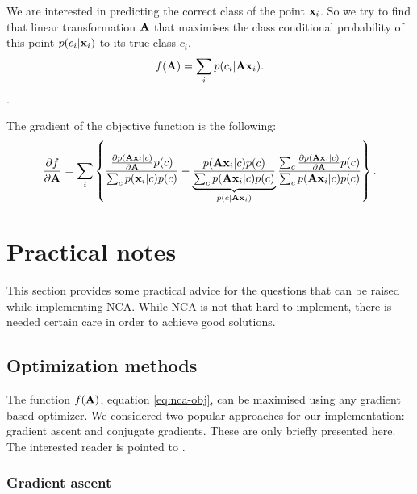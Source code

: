 	We are interested in predicting the correct class of the point $\mathbf{x}_i$. So we
	try to find that linear transformation $\mathbf{A}$ that maximises the class
	conditional probability of this point $p(c_i|\mathbf{x}_i)$ to its true class $c_i$.
	\begin{align}
	    f(\mathbf{A}) = \sum_i p(c_i|\mathbf{A}\mathbf{x}_i).
	    \label{eq:nca-cc-kde-obj}
	\end{align}.
	
	The gradient of the objective function is the following:
	\begin{align}
	    \frac{\partial f}{\partial \mathbf{A}} =
	      \sum_i \left\{
	                \frac
	                {
	                    \frac{\partial p(\mathbf{A}\mathbf{x}_i|c)}{\partial \mathbf{A}}p(c)
	                }
	                {
	                    \sum_c p(\mathbf{x}_i|c)p(c)
	                }
	                - \underbrace{\frac{
	                    p(\mathbf{A}\mathbf{x}_i|c)p(c)
	                }{
	                    \sum_c p(\mathbf{A}\mathbf{x}_i|c)p(c)
	                }}_{p(c|\mathbf{A}\mathbf{x}_i)}
	                \frac{
	                    \sum_c \frac{\partial p(\mathbf{A}\mathbf{x}_i|c)}{\partial \mathbf{A}}p(c)
	                }{
	                    \sum_c p(\mathbf{A}\mathbf{x}_i|c)p(c)
	                }
	             \right \}.
	    \label{eq:nca-cc-kde-grad}
	\end{align}
	

\section{Practical notes}
\label{sec:practical-notes}

	This section provides some practical advice for the questions 
	that can be raised while implementing NCA. 
	While NCA is not that hard to implement, there is needed certain care
	in order to achieve good solutions.

\subsection{Optimization methods}
\label{subsec:optimization}

	The function $f(\mathbf{A})$, equation \ref{eq:nca-obj}, can be maximised using any gradient based optimizer. We considered two popular approaches for our implementation: gradient ascent and conjugate gradients. These are only briefly presented here. The interested reader is pointed to \citet{bishop1995}.

	\subsubsection*{Gradient ascent}

